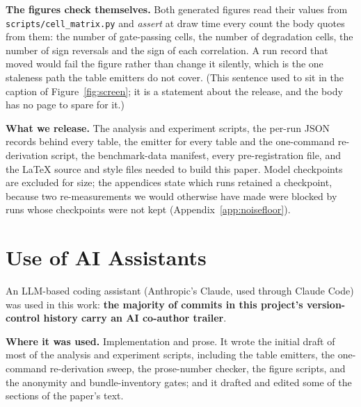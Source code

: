 \textbf{The figures check themselves.}  Both generated figures read their values
from \texttt{scripts/cell\_matrix.py} and \emph{assert} at draw time every count the
body quotes from them: the number of gate-passing cells, the number of degradation
cells, the number of sign reversals and the sign of each correlation.  A run record
that moved would fail the figure rather than change it silently, which is the one
staleness path the table emitters do not cover.  (This sentence used to sit in the
caption of Figure~\ref{fig:screen}; it is a statement about the release, and the body
has no page to spare for it.)

\textbf{What we release.}  The analysis and experiment scripts, the per-run JSON
records behind every table, the emitter for every table and the one-command
re-derivation script, the benchmark-data manifest, every pre-registration file, and
the \LaTeX{} source and style files needed to build this paper.  Model checkpoints
are excluded for size; the appendices state which runs retained a checkpoint,
because two re-measurements we would otherwise have made were blocked by runs
whose checkpoints were not kept (Appendix~\ref{app:noisefloor}).

\section*{Use of AI Assistants}

An LLM-based coding assistant (Anthropic's Claude, used through Claude Code) was
used in this work: \textbf{the majority of commits in this project's
version-control history carry an AI co-author trailer}.

\textbf{Where it was used.}  Implementation and prose. It wrote the initial draft of most
of the analysis and experiment scripts, including the table emitters, the
one-command re-derivation sweep, the prose-number checker, the figure scripts, and
the anonymity and bundle-inventory gates; and it drafted and edited some of the sections of the paper's
text.


